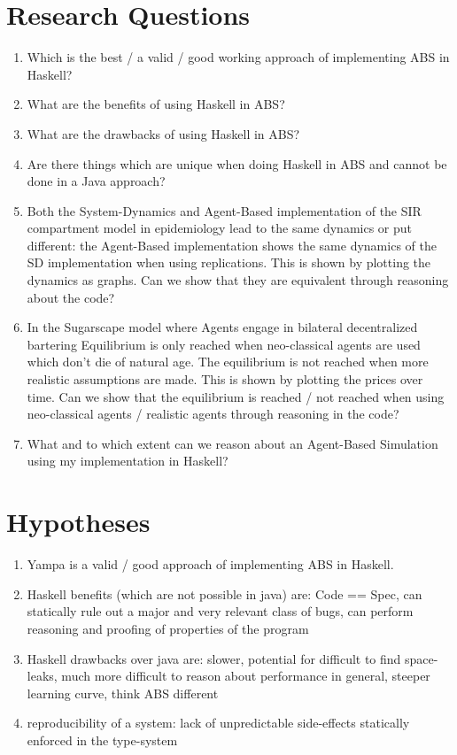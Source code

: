 \section{Research Questions}
\begin{enumerate}
	\item Which is the best / a valid / good working approach of implementing ABS in Haskell?
	\item What are the benefits of using Haskell in ABS?
	\item What are the drawbacks of using Haskell in ABS?
	\item Are there things which are unique when doing Haskell in ABS and cannot be done in a Java approach?
	\item Both the System-Dynamics and Agent-Based implementation of the SIR compartment model in epidemiology lead to the same dynamics or put different: the Agent-Based implementation shows the same dynamics of the SD implementation when using replications. This is shown by plotting the dynamics as graphs. Can we show that they are equivalent through reasoning about the code?
	\item In the Sugarscape model where Agents engage in bilateral decentralized bartering Equilibrium is only reached when neo-classical agents are used which don't die of natural age. The equilibrium is not reached when more realistic assumptions are made. This is shown by plotting the prices over time. Can we show that the equilibrium is reached / not reached when using neo-classical agents / realistic agents through reasoning in the code?
	\item What and to which extent can we reason about an Agent-Based Simulation using my implementation in Haskell?
\end{enumerate}

\section{Hypotheses}
\begin{enumerate}
	\item Yampa is a valid / good approach of implementing ABS in Haskell.
	\item Haskell benefits (which are not possible in java) are: Code == Spec, can statically rule out a major and very relevant class of bugs, can perform reasoning and proofing of properties of the program
	\item Haskell drawbacks over java are: slower, potential for difficult to find space-leaks, much more difficult to reason about performance in general, steeper learning curve, think ABS different 
	\item reproducibility of a system: lack of unpredictable side-effects statically enforced in the type-system
\end{enumerate}